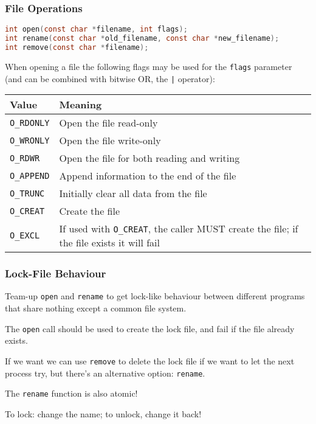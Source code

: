 \begin{frame}[fragile]
	\frametitle{File Operations}
	\begin{lstlisting}[language=C]
int open(const char *filename, int flags); 
int rename(const char *old_filename, const char *new_filename);
int remove(const char *filename); 
\end{lstlisting}

	When opening a file the following flags may be used for the \texttt{flags} parameter (and can be combined with bitwise OR, the \texttt{|} operator):

	{\scriptsize
	\begin{tabular}{l|l}
		\textbf{Value}     & \textbf{Meaning}                                                                                 \\ \hline
		\texttt{O\_RDONLY} & Open the file read-only                                                                          \\ \hline
		\texttt{O\_WRONLY} & Open the file write-only                                                                         \\ \hline
		\texttt{O\_RDWR}   & Open the file for both reading and writing                                                       \\ \hline
		\texttt{O\_APPEND} & Append information to the end of the file                                                        \\ \hline
		\texttt{O\_TRUNC}  & Initially clear all data from the file                                                           \\ \hline
		\texttt{O\_CREAT}  & Create the file                                                                                  \\ \hline
		\texttt{O\_EXCL}   & If used with \texttt{O\_CREAT}, the caller MUST create the file; if the file exists it will fail \\
	\end{tabular}
	}

\end{frame}


\begin{frame}
	\frametitle{Lock-File Behaviour}

	Team-up \texttt{open} and \texttt{rename} to get lock-like behaviour between different programs that share nothing except a common file system.

	The \texttt{open} call should be used to create the lock file, and fail if the file already exists.

	If we want we can use \texttt{remove} to delete the lock file if we want to let the next process try, but there's an alternative option: \texttt{rename}.

	The \texttt{rename} function is also atomic!

	To lock: change the name; to unlock, change it back!

\end{frame}


